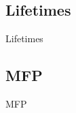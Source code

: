 \documentclass{beamer}
\begin{document}
\subsection{Lifetimes}
\begin{frame}{Lifetimes}
\begin{figure}[!h]
\begin{center}
\vspace*{-0.8cm}
\renewcommand{\figure}{Fig.}
\label{fig:lifetimes}
\end{center}
\end{figure}
\end{frame}

\subsection{MFP}
\begin{frame}{MFP}
\begin{figure}[t]
\begin{center}
\vspace*{-0.8cm}
\renewcommand{\figure}{Fig.}
\label{fig:mfp_contribution}
\end{center}
\end{figure}
\end{frame}


\end{document}

